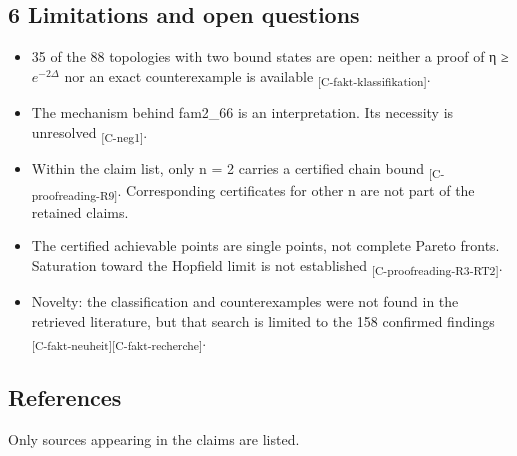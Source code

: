 \documentclass[
  english,
  twocolumn,
  10pt]{article}
\providecommand{\tightlist}{%
  \setlength{\itemsep}{0pt}\setlength{\parskip}{0pt}}
\begin{document}
\subsection{6 Limitations and open
questions}\label{limitations-and-open-questions}

\begin{itemize}
\tightlist
\item
  35 of the 88 topologies with two bound states are open: neither a
  proof of η ≥ \(e^{-2\Delta}\) nor an exact counterexample is available
  \textsubscript{[C-fakt-klassifikation]}.
\item
  The mechanism behind fam2\_66 is an interpretation. Its necessity is
  unresolved \textsubscript{[C-neg1]}.
\item
  Within the claim list, only n = 2 carries a certified chain bound
  \textsubscript{[C-proofreading-R9]}. Corresponding certificates for
  other n are not part of the retained claims.
\item
  The certified achievable points are single points, not complete Pareto
  fronts. Saturation toward the Hopfield limit is not established
  \textsubscript{[C-proofreading-R3-RT2]}.
\item
  Novelty: the classification and counterexamples were not found in the
  retrieved literature, but that search is limited to the 158 confirmed
  findings
  \textsubscript{[C-fakt-neuheit]}\textsubscript{[C-fakt-recherche]}.
\end{itemize}

\subsection{References}\label{references}

Only sources appearing in the claims are listed.
\end{document}
